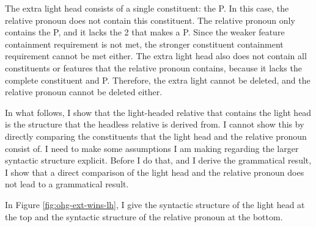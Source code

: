 The extra light head consists of a single constituent: the P.
In this case, the relative pronoun does not contain this constituent. The relative pronoun only contains the P, and it lacks the 2 that makes a P. Since the weaker feature containment requirement is not met, the stronger constituent containment requirement cannot be met either.
The extra light head also does not contain all constituents or features that the relative pronoun contains, because it lacks the complete constituent and P.
Therefore, the extra light cannot be deleted, and the relative pronoun cannot be deleted either.


In what follows, I show that the light-headed relative that contains the light head is the structure that the headless relative is derived from. I cannot show this by directly comparing the constituents that the light head and the relative pronoun consist of. I need to make some assumptions I am making regarding the larger syntactic structure explicit. Before I do that, and I derive the grammatical result, I show that a direct comparison of the light head and the relative pronoun does not lead to a grammatical result.

In Figure \ref{fig:ohg-ext-wins-lh}, I give the syntactic structure of the light head at the top and the syntactic structure of the relative pronoun at the bottom.

